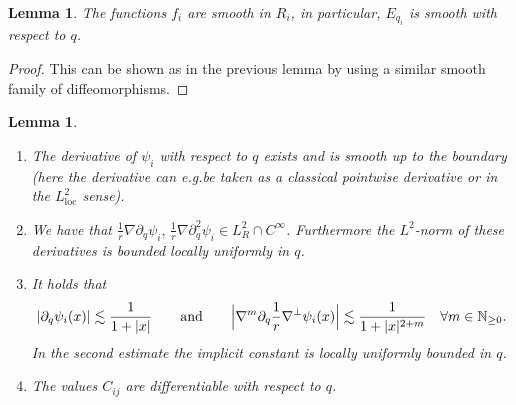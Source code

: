 \documentclass[10pt]{amsart}
\newcommand{\eg}{e.g.}
\newcommand{\skpt}{\par\smallskip\noindent}
\newcommand{\loc}{\mathrm{loc}}
\newtheorem{lemma}[theorem]{Lemma}
\theoremstyle{definition}
\newcommand\N{\mathbb{N}}
\let\de\partial
\begin{document}
\begin{lemma}
The functions $f_i$ are smooth in $R_i$, in particular, $E_{q_i}$ is smooth with respect to $q$.
\end{lemma}
\begin{proof}This can be shown as in the previous lemma by using a similar smooth family of diffeomorphisms.\end{proof}

\skpt
\begin{lemma}\label{PsiDeri}
\begin{enumerate}
\item\label{PsiDeria} The derivative of $\psi_i$ with respect to $q$ exists and is smooth up to the boundary (here the derivative can \eg be taken as a classical pointwise derivative or in the $L_{\loc}^2$ sense).
\item\label{PsiDerib} We have that $\frac{1}{r}\nabla\de_q\psi_i,\,\frac{1}{r}\nabla\de_q^2\psi_i\in L_R^2\cap C^\infty$. Furthermore the $L^2$-norm of these derivatives is bounded locally uniformly in $q$.
\item\label{PsiDeric} It holds that
\[
\left|\de_q\psi_i(x)\right|\lesssim \frac{1}{1+|x|}\qquad\text{and}\qquad
\Bigl|\nabla^m\de_q\frac{1}{r}\nabla^\perp\psi_i(x)\Bigr|\lesssim \frac{1}{1+|x|^{2+m}}\quad \forall m\in\N_{\geq0}.
\]
In the second estimate the implicit constant is locally uniformly bounded in $q$.
\item\label{PsiDerid} The values $C_{ij}$ are differentiable with respect to $q$.
\end{enumerate}
\end{lemma}
\end{document}
